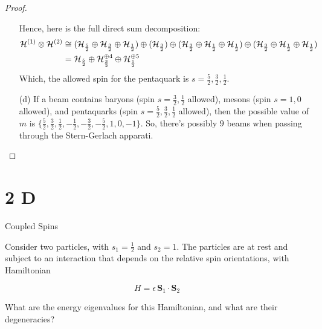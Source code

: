 \documentclass{article}
\begin{document}
\begin{proof}
\begin{itemize}
        Hence, here is the full direct sum decomposition:
        \begin{align}
            \mathcal{H}^{(1)}\tensor \mathcal{H}^{(2)} &\cong (\mathcal{H}_\frac{5}{2}\oplus \mathcal{H}_\frac{3}{2}\oplus \mathcal{H}_\frac{1}{2}) \oplus (\mathcal{H}_\frac{3}{2}) \oplus (\mathcal{H}_{\frac{3}{2}}\oplus\mathcal{H}_{\frac{1}{2}}\oplus \mathcal{H}_{\frac{1}{2}})\oplus (\mathcal{H}_{\frac{3}{2}}\oplus\mathcal{H}_{\frac{1}{2}}\oplus \mathcal{H}_{\frac{1}{2}})\\
            &= \mathcal{H}_\frac{5}{2}\oplus \mathcal{H}_\frac{3}{2}^{\oplus 4}\oplus \mathcal{H}_\frac{1}{2}^{\oplus 5}
        \end{align}
        Which, the allowed spin for the pentaquark is $s=\frac{5}{2},\frac{3}{2},\frac{1}{2}$.

        \hfil

        \item[(d)] If a beam contains baryons (spin $s=\frac{3}{2},\frac{1}{2}$ allowed), mesons (spin $s=1,0$ allowed), and pentaquarks (spin $s=\frac{5}{2},\frac{3}{2},\frac{1}{2}$ allowed), then the possible value of $m$ is $\{\frac{5}{2},\frac{3}{2},\frac{1}{2},-\frac{1}{2},-\frac{3}{2},-\frac{5}{2},1,0,-1\}$. So, there's possibly $9$ beams when passing through the Stern-Gerlach apparati.
    \end{itemize}
\end{proof}

\newpage

\section*{2 D}
\begin{ques}\label{q2}
Coupled Spins

Consider two particles, with \( s_1 = \frac{1}{2} \) and \( s_2 = 1 \). The particles are at rest and subject to an interaction that depends on the relative spin orientations, with Hamiltonian

\[
H = \epsilon \, \mathbf{S}_1 \cdot \mathbf{S}_2
\]

What are the energy eigenvalues for this Hamiltonian, and what are their degeneracies?
\end{ques}
\end{document}
